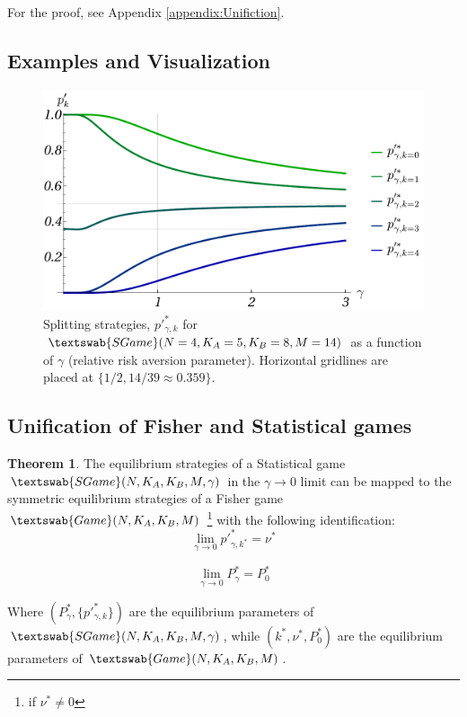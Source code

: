 \documentclass{article}
\theoremstyle{definition}
\newtheorem{theorem}{Theorem}[section]
\newcommand{\G}[1]{$\textswab{Game}(#1)$}
\newcommand{\SG}[1]{$\textswab{SGame}(#1)$}
\begin{document}
For the proof, see Appendix \ref{appendix:Unifiction}.


\subsection{Examples and Visualization}

\begin{figure}[H]
    \centering
    \includegraphics[width=12 cm]{img/pp_gamma_4_5_8_14.pdf}
    \caption{Splitting strategies, $p'^*_{\gamma,k}$ for \SG{N=4, K_A=5, K_B=8, M=14} as a function of $\gamma$ (relative risk aversion parameter). Horizontal gridlines are placed at $\{1/2 , 14/39 \approx 0.359 \}$.}
    \label{fig:pp(gamma)_45814}
\end{figure}

\subsection{Unification of Fisher and Statistical games}

\begin{theorem}
    The equilibrium strategies of a Statistical game \SG{N,K_A,K_B,M,\gamma} in the $\gamma \to 0$ limit can be mapped to the symmetric equilibrium strategies of a Fisher game \G{N,K_A,K_B,M} \footnote{if $\nu^* \ne 0$} with the following identification:
    \begin{equation}
        \lim_{\gamma \to 0} p'^*_{\gamma,k^*} = \nu^*
    \end{equation}
        
    \begin{equation}
        \lim_{\gamma \to 0} P^*_\gamma = P^*_0
    \end{equation}

    Where $(P^*_\gamma,\{p'^*_{\gamma,k}\})$ are the equilibrium parameters of 
    \SG{N,K_A,K_B,M,\gamma},
    while $(k^*,\nu^*,P^*_0)$ are the equilibrium parameters of 
    \G{N,K_A,K_B,M}.
    
\end{theorem}
\end{document}

